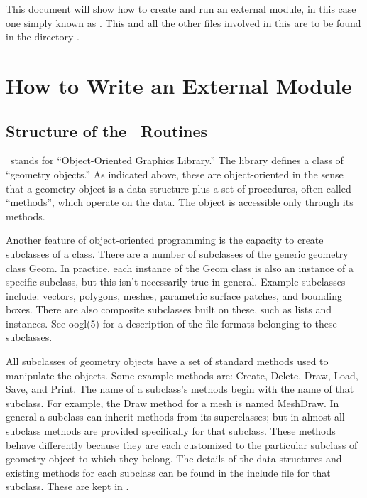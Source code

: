 This document will show how to create and run an external module,
in this case one simply known as .
This and all the other files involved in this are to be found
in the directory .

\section{How to Write an External Module}

\subsection{Structure of the \OOGL\  Routines}

\OOGL\  stands for ``Object-Oriented Graphics Library.''  
The library
defines a class of ``geometry objects.''  As indicated above,
these are object-oriented 
in the sense that a geometry object is a
data structure plus a set of procedures, often called
``methods'', which operate on the data.  
The object is accessible only through its methods.

Another feature of object-oriented programming is the capacity
to create subclasses of a class.
There are a number of subclasses of the generic geometry  class Geom.
In practice, each instance of the Geom class is also an instance  
of a specific subclass, but this isn't necessarily true in general. 
Example subclasses include: vectors, polygons,
meshes, parametric surface patches, and bounding boxes.
There are also composite subclasses built on these, such as
lists and instances.  See oogl(5) for a description of the
file formats belonging to these subclasses.  

All subclasses of geometry objects have a set of standard methods used to
manipulate the objects.  Some example methods are: Create, Delete,
Draw, Load, Save, and Print.  
The name of a subclass's methods
begin with the name of that subclass.
For example, the Draw method for a mesh is named MeshDraw.
In general a subclass can inherit
methods from its superclasses; but in {\OOGL} almost all subclass
methods are provided specifically for that subclass.
These methods behave differently
because they are each customized to the particular subclass of 
geometry object to which they belong.  
The details of the data structures and existing methods
for each subclass can be found in the include file for that
subclass. These are kept in
.

